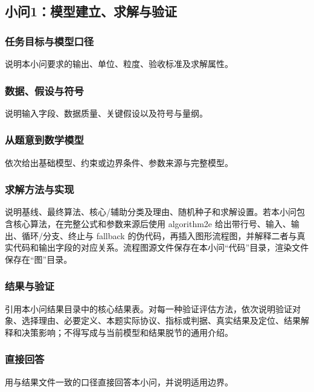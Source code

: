 \subsection{小问1：模型建立、求解与验证}

\subsubsection{任务目标与模型口径}
说明本小问要求的输出、单位、粒度、验收标准及求解属性。

\subsubsection{数据、假设与符号}
说明输入字段、数据质量、关键假设以及符号与量纲。

\subsubsection{从题意到数学模型}
依次给出基础模型、约束或边界条件、参数来源与完整模型。

\subsubsection{求解方法与实现}
说明基线、最终算法、核心/辅助分类及理由、随机种子和求解设置。若本小问包含核心算法，在完整公式和参数来源后使用 algorithm2e 给出带行号、输入、输出、循环/分支、终止与 fallback 的伪代码，再插入图形流程图，并解释二者与真实代码和输出字段的对应关系。流程图源文件保存在本小问“代码”目录，渲染文件保存在“图”目录。

\subsubsection{结果与验证}
\label{sec:q1-s1-validation}
引用本小问结果目录中的核心结果表。对每一种验证评估方法，依次说明验证对象、选择理由、必要定义、本题实际协议、指标或判据、真实结果及定位、结果解释和决策影响；不得写成与当前模型和结果脱节的通用介绍。

\subsubsection{直接回答}
用与结果文件一致的口径直接回答本小问，并说明适用边界。
